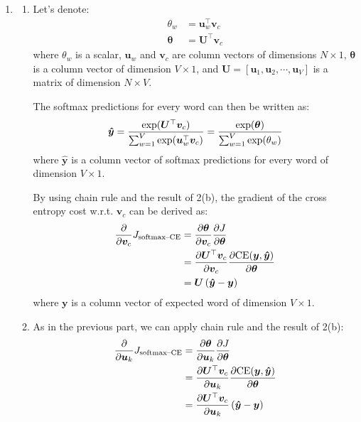 \documentclass[10pt,reqno]{amsart}
\begin{document}
\begin{enumerate}[topsep=0pt,itemsep=2ex,partopsep=1ex,parsep=1ex]
\item
  \begin{enumerate}
  \item
    Let's denote:
    \begin{align*}
      \theta_w &= \bm{u}_w^\top \bm{v}_c \\
      \bm{\theta} &= \bm{U}^\top \bm{v}_c
    \end{align*}
    where $\theta_w$ is a scalar,
    $\bm{u}_w$ and $\bm{v}_c$ are column vectors of dimensions $N \times 1$,
    $\bm{\theta}$ is a column vector of dimension $V \times 1$, 
    and $\bm{U} = [\bm{u}_1, \bm{u}_2, \cdots, \bm{u}_V]$ is a matrix of dimension $N \times V$.

    The softmax predictions for every word can then be written as:
    \begin{equation*}
      \bm{\hat{y}} = \frac{\exp(\bm{U}^\top \bm{v}_c)}{\sum_{w=1}^{V} \exp(\bm{u}_w^\top \bm{v}_c)}
      = \frac{\exp(\bm{\theta})}{\sum_{w=1}^{V} \exp(\theta_w)}
    \end{equation*}
    where $\bm{\hat{y}}$ is a column vector of softmax predictions for every word of dimension $V \times 1$.

    By using chain rule and the result of 2(b), the gradient of the cross entropy cost w.r.t. $\bm{v}_c$ 
    can be derived as:
    \begin{align*}
      \frac{\partial}{\partial \bm{v}_c} J_\text{softmax--CE}
      &= \frac{\partial \bm{\theta}}{\partial \bm{v}_c} \frac{\partial J}{\partial \bm{\theta}} \\
      &= \frac{\partial \bm{U}^\top \bm{v}_c}{\partial \bm{v}_c} \frac{\partial \text{CE}(\bm{y}, \bm{\hat{y}})}{\partial \bm{\theta}} \\
      &= \bm{U} \left( \bm{\hat{y}} - \bm{y} \right)
    \end{align*}
    where $\bm{y}$ is a column vector of expected word of dimension $V \times 1$.
  \item
    As in the previous part, we can apply chain rule and the result of 2(b):
    \begin{align}
      \frac{\partial}{\partial \bm{u}_k} J_\text{softmax--CE}
      &= \frac{\partial \bm{\theta}}{\partial \bm{u}_k} \frac{\partial J}{\partial \bm{\theta}} \nonumber \\
      &= \frac{\partial \bm{U}^\top \bm{v}_c}{\partial \bm{u}_k} \frac{\partial \text{CE}(\bm{y}, \bm{\hat{y}})}{\partial \bm{\theta}} \nonumber \\
      &= \frac{\partial \bm{U}^\top \bm{v}_c}{\partial \bm{u}_k} \left( \bm{\hat{y}} - \bm{y} \right) \label{3b}
    \end{align}
    

\end{enumerate}
\end{enumerate}
\end{document}
